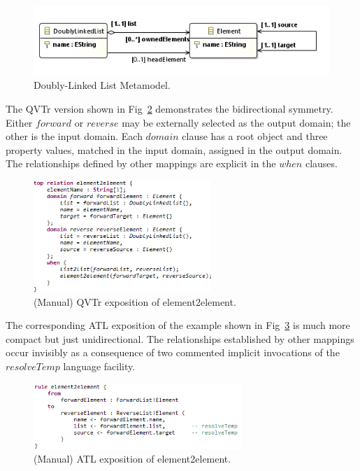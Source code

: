 \documentclass{llncs}
\begin{document}
\begin{figure}[h]
	\centering
	\includegraphics[width=1.0\textwidth]{doublylinkedlist.png}
	\caption{Doubly-Linked List Metamodel.}
	\label{fig:doublylinkedlist}
\end{figure}

The QVTr version shown in Fig~\ref{fig:QVTrelement2element} demonstrates the bidirectional symmetry. Either $forward$ or $reverse$  may be externally  selected as the output domain; the other is the input domain. Each $domain$ clause has a root object and three property values, matched in the input domain, assigned in the output domain. The relationships defined by other mappings are explicit in the $when$ clauses. 

\begin{figure}[h]
	\centering
	\includegraphics[width=0.6\textwidth]{QVTrelement2element.png}
	\caption{(Manual) QVTr exposition of element2element.}
	\label{fig:QVTrelement2element}
\end{figure}

The corresponding ATL \cite{Eclipse-ATL} exposition of the example shown in Fig~\ref{fig:ATLelement2element} is much more compact but just unidirectional. The relationships established by other mappings occur invisibly as a consequence of two commented implicit invocations of the $resolveTemp$ language facility.

\begin{figure}[h]
	\centering
	\includegraphics[width=0.7\textwidth]{ATLelement2element.png}
	\caption{(Manual) ATL exposition of element2element.}
	\label{fig:ATLelement2element}
\end{figure}
\end{document}
